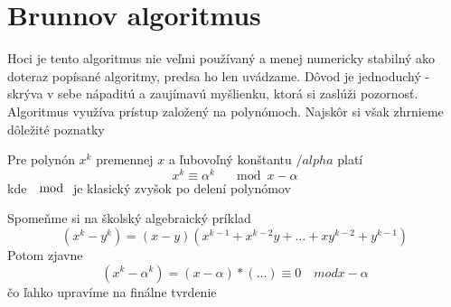 \section{Brunnov algoritmus}

Hoci je tento algoritmus nie veľmi používaný a menej numericky
stabilný ako doteraz popísané algoritmy, predsa ho len uvádzame.
Dôvod je jednoduchý - skrýva v sebe nápaditú a zaujímavú myšlienku,
ktorá si zaslúži pozornosť. Algoritmus využíva prístup založený na
polynómoch. Najskôr si však zhrnieme dôležité poznatky

\begin{lema}
    Pre polynón $x^k$ premennej $x$ a ľubovoľný konštantu $/alpha$
    platí
    \begin{equation}
        x^k \equiv \alpha^k \quad \mod x-\alpha
    \end{equation}
    kde $\mod$ je klasický zvyšok po delení polynómov
    \label{lema:polymod}
\end{lema}
\begin{dokaz}
    Spomeňme si na školský algebraický príklad
    \begin{equation}
        (x^k - y^k) = (x - y) (x^{k-1} + x^{k-2} y + \dots 
            + x y^{k-2} + y^{k-1})
    \end{equation}
    Potom zjavne
    \begin{equation}
        (x^k - \alpha^k) = (x - \alpha) * (\dots) \equiv 0 
        \quad mod x-\alpha
    \end{equation}
    čo ľahko upravíme na finálne tvrdenie
\end{dokaz}



